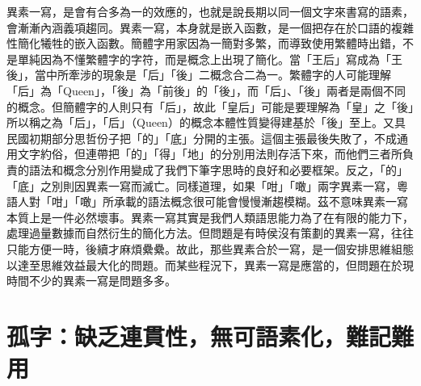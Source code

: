 \documentclass[a5paper, 10pt, openany]{book} %
\begin{document}
異素一寫，是會有合多為一的效應的，也就是說長期以同一個文字來書寫的語素，會漸漸內涵義項趨同。異素一寫，本身就是嵌入函數，是一個把存在於口語的複雜性簡化犧牲的嵌入函數。簡體字用家因為一簡對多繁，而導致使用繁體時出錯，不是單純因為不懂繁體字的字符，而是概念上出現了簡化。當「王后」寫成為「王後」，當中所牽涉的現象是「后」「後」二概念合二為一。繁體字的人可能理解「后」為「Queen」，「後」為「前後」的「後」，而「后」、「後」兩者是兩個不同的概念。但簡體字的人則只有「后」，故此「皇后」可能是要理解為「皇」之「後」所以稱之為「后」，「后」（Queen）的概念本體性質變得建基於「後」至上。又具民國初期部分思哲份子把「的」「底」分開的主張。這個主張最後失敗了，不成通用文字約俗，但連帶把「的」「得」「地」的分別用法則存活下來，而他們三者所負責的語法和概念分別作用變成了我們下筆字思時的良好和必要框架。反之，「的」「底」之別則因異素一寫而滅亡。同樣道理，如果「咁」「噉」兩字異素一寫，粵語人對「咁」「噉」所承載的語法概念很可能會慢慢漸趨模糊。茲不意味異素一寫本質上是一件必然壞事。異素一寫其實是我們人類語思能力為了在有限的能力下，處理過量數據而自然衍生的簡化方法。但問題是有時侯沒有策劃的異素一寫，往往只能方便一時，後續才麻煩纍纍。故此，那些異素合於一寫，是一個安排思維組態以達至思維效益最大化的問題。而某些程況下，異素一寫是應當的，但問題在於現時間不少的異素一寫是問題多多。

\section{孤字：缺乏連貫性，無可語素化，難記難用}




\end{document}
